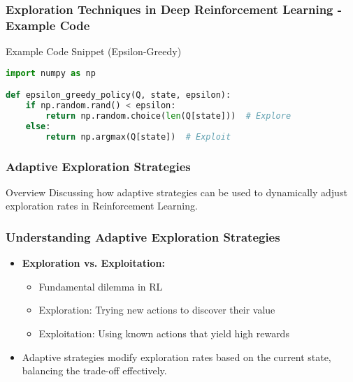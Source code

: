 \documentclass[aspectratio=169]{beamer}
\begin{document}
\begin{frame}[fragile]
    \frametitle{Exploration Techniques in Deep Reinforcement Learning - Example Code}
    \begin{block}{Example Code Snippet (Epsilon-Greedy)}
        \begin{lstlisting}[language=Python]
import numpy as np

def epsilon_greedy_policy(Q, state, epsilon):
    if np.random.rand() < epsilon:
        return np.random.choice(len(Q[state]))  # Explore
    else:
        return np.argmax(Q[state])  # Exploit
        \end{lstlisting}
    \end{block}
\end{frame}

\begin{frame}[fragile]
    \frametitle{Adaptive Exploration Strategies}
    \begin{block}{Overview}
        Discussing how adaptive strategies can be used to dynamically adjust exploration rates in Reinforcement Learning.
    \end{block}
\end{frame}

\begin{frame}[fragile]
    \frametitle{Understanding Adaptive Exploration Strategies}
    \begin{itemize}
        \item \textbf{Exploration vs. Exploitation:}
        \begin{itemize}
            \item Fundamental dilemma in RL
            \item Exploration: Trying new actions to discover their value
            \item Exploitation: Using known actions that yield high rewards
        \end{itemize}
        \item Adaptive strategies modify exploration rates based on the current state, balancing the trade-off effectively.
    \end{itemize}
\end{frame}
\end{document}
